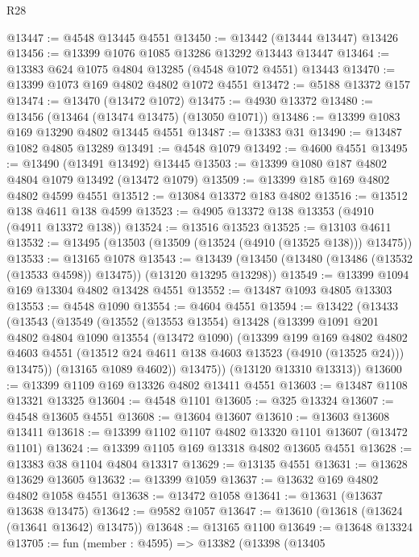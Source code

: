 \begin{lexlean}{R28}
\begin{coremodule}
@13447 := @4548 @13445 @4551
@13450 := @13442 (@13444 @13447) @13426
@13456 := @13399 @1076 @1085 @13286 @13292 @13443 @13447
@13464 := @13383 @624 @1075 @4804 @13285 (@4548 @1072 @4551) @13443
@13470 := @13399 @1073 @169 @4802 @4802 @1072 @4551
@13472 := @5188 @13372 @157
@13474 := @13470 (@13472 @1072)
@13475 := @4930 @13372
@13480 := @13456 (@13464 (@13474 @13475) (@13050 @1071))
@13486 := @13399 @1083 @169 @13290 @4802 @13445 @4551
@13487 := @13383 @31
@13490 := @13487 @1082 @4805 @13289
@13491 := @4548 @1079
@13492 := @4600 @4551
@13495 := @13490 (@13491 @13492) @13445
@13503 := @13399 @1080 @187 @4802 @4804 @1079 @13492 (@13472 @1079)
@13509 := @13399 @185 @169 @4802 @4802 @4599 @4551
@13512 := @13084 @13372 @183 @4802
@13516 := @13512 @138 @4611 @138 @4599
@13523 := @4905 @13372 @138 @13353 (@4910 (@4911 @13372 @138))
@13524 := @13516 @13523
@13525 := @13103 @4611
@13532 := @13495 (@13503 (@13509 (@13524 (@4910 (@13525 @138))) @13475))
@13533 := @13165 @1078
@13543 := @13439 (@13450 (@13480 (@13486 (@13532 (@13533 @4598)) @13475)) (@13120 @13295 @13298))
@13549 := @13399 @1094 @169 @13304 @4802 @13428 @4551
@13552 := @13487 @1093 @4805 @13303
@13553 := @4548 @1090
@13554 := @4604 @4551
@13594 := @13422
    (@13433
      (@13543
        (@13549
          (@13552
            (@13553 @13554)
            @13428
            (@13399
              @1091
              @201
              @4802
              @4804
              @1090
              @13554
              (@13472 @1090)
              (@13399
                @199
                @169
                @4802
                @4802
                @4603
                @4551
                (@13512 @24 @4611 @138 @4603 @13523 (@4910 (@13525 @24)))
                @13475))
            (@13165 @1089 @4602))
          @13475))
      (@13120 @13310 @13313))
@13600 := @13399 @1109 @169 @13326 @4802 @13411 @4551
@13603 := @13487 @1108 @13321 @13325
@13604 := @4548 @1101
@13605 := @325 @13324
@13607 := @4548 @13605 @4551
@13608 := @13604 @13607
@13610 := @13603 @13608 @13411
@13618 := @13399 @1102 @1107 @4802 @13320 @1101 @13607 (@13472 @1101)
@13624 := @13399 @1105 @169 @13318 @4802 @13605 @4551
@13628 := @13383 @38 @1104 @4804 @13317
@13629 := @13135 @4551
@13631 := @13628 @13629 @13605
@13632 := @13399 @1059
@13637 := @13632 @169 @4802 @4802 @1058 @4551
@13638 := @13472 @1058
@13641 := @13631 (@13637 @13638 @13475)
@13642 := @9582 @1057
@13647 := @13610 (@13618 (@13624 (@13641 @13642) @13475))
@13648 := @13165 @1100
@13649 := @13648 @13324
@13705 := fun (member : @4595) =>
  @13382
    (@13398
      (@13405

\end{coremodule}
\end{lexlean}
